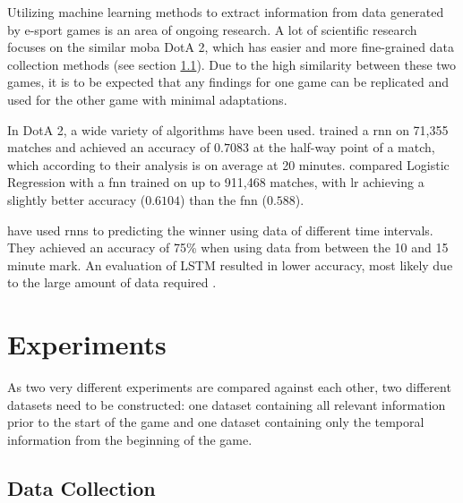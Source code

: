 \documentclass[12pt, a4paper, headinclude, twoside, plainheadsepline, open=right, numbers=noenddot, hidelinks, toc=listof, toc=bibliography]{scrreprt}
\begin{document}
Utilizing machine learning methods to extract information from data generated by e-sport games is an area of ongoing research.
A lot of scientific research focuses on the similar \ac{moba} DotA 2, which has easier and more fine-grained data collection methods (see section \ref{sec:datacoll}).
Due to the high similarity between these two games, it is to be expected that any findings for one game can be replicated and used for the other game with minimal adaptations.

In DotA 2, a wide variety of algorithms have been used.  
 \cite{yuMOBASliceTimeSlice2018} trained a \ac{rnn} on 71,355 matches and achieved an accuracy of $0.7083$ at the half-way point of a match, which according to their analysis is on average at 20 minutes.
 \cite{wangPredictingMultiplayerOnline2016} compared Logistic Regression with a \ac{fnn} trained on up to 911,468 matches, with \ac{lr} achieving a slightly better accuracy ($0.6104$) than the \ac{fnn} ($0.588$).


 have used \acp{rnn} to predicting the winner using data of different time intervals. They achieved an accuracy of 75\% when using data from between the 10 and 15 minute mark.
An evaluation of LSTM resulted in lower accuracy, most likely due to the large amount of data required \cite{silvaContinuousOutcomePrediction2018}.






\chapter{Experiments}
\label{chap:experiments}

As two very different experiments are compared against each other, two different datasets need to be constructed: one dataset containing all relevant information prior to the start of the game and one dataset containing only the temporal information from the beginning of the game.


\section{Data Collection}
\label{sec:datacoll}
\end{document}
